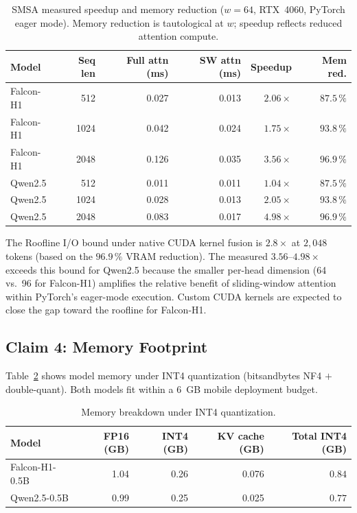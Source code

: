 \documentclass[11pt]{article}
\begin{document}
\begin{table}[H]
\centering
\small
\caption{SMSA measured speedup and memory reduction ($w{=}64$, RTX~4060,
         PyTorch eager mode). Memory reduction is tautological at $w$; speedup
         reflects reduced attention compute.}
\label{tab:smsa_speed}
\begin{tabular}{lrrrrr}
\toprule
Model & Seq len & Full attn (ms) & SW attn (ms) & Speedup & Mem red. \\
\midrule
Falcon-H1 &  512 & 0.027 & 0.013 & $2.06\!\times$          & $87.5\,\%$ \\
Falcon-H1 & 1024 & 0.042 & 0.024 & $1.75\!\times$          & $93.8\,\%$ \\
Falcon-H1 & 2048 & 0.126 & 0.035 & $\mathbf{3.56\!\times}$ & $\mathbf{96.9\,\%}$ \\
Qwen2.5   &  512 & 0.011 & 0.011 & $1.04\!\times$          & $87.5\,\%$ \\
Qwen2.5   & 1024 & 0.028 & 0.013 & $2.05\!\times$          & $93.8\,\%$ \\
Qwen2.5   & 2048 & 0.083 & 0.017 & $\mathbf{4.98\!\times}$ & $\mathbf{96.9\,\%}$ \\
\bottomrule
\end{tabular}
\end{table}

The Roofline I/O bound under native CUDA kernel fusion is $2.8\!\times$ at
$2{,}048$ tokens (based on the $96.9\,\%$ VRAM reduction). The measured
$3.56$--$4.98\!\times$ exceeds this bound for Qwen2.5 because the smaller
per-head dimension (64 vs.\ 96 for Falcon-H1) amplifies the relative benefit
of sliding-window attention within PyTorch's eager-mode execution. Custom
CUDA kernels are expected to close the gap toward the roofline for
Falcon-H1.

\subsection{Claim 4: Memory Footprint}
Table~\ref{tab:memory} shows model memory under INT4 quantization
(bitsandbytes NF4 $+$ double-quant). Both models fit within a 6~GB mobile
deployment budget.

\begin{table}[H]
\centering
\small
\caption{Memory breakdown under INT4 quantization.}
\label{tab:memory}
\begin{tabular}{lrrrr}
\toprule
Model & FP16 (GB) & INT4 (GB) & KV cache (GB) & Total INT4 (GB) \\
\midrule
Falcon-H1-0.5B & 1.04 & 0.26 & 0.076 & $\mathbf{0.84}$ \\
Qwen2.5-0.5B   & 0.99 & 0.25 & 0.025 & $\mathbf{0.77}$ \\
\bottomrule
\end{tabular}
\end{table}
\end{document}
